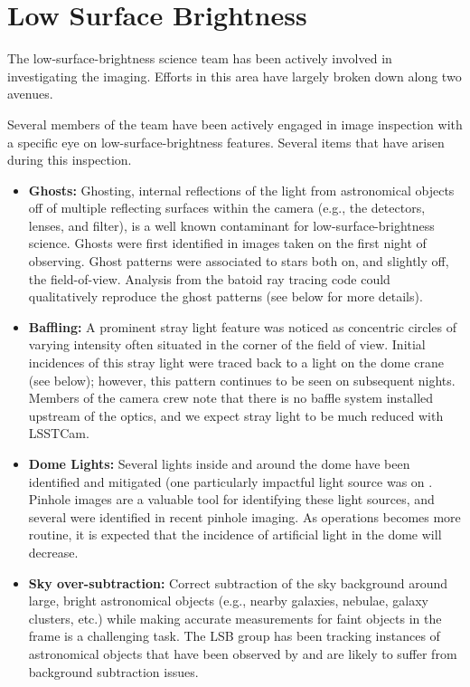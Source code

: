 \section{Low Surface Brightness}
\label{sec:low_surface_brightness}

The low-surface-brightness science team has been actively involved in investigating the \ComCam imaging. Efforts in this area have largely broken down along two avenues.

 Several members of the team have been actively engaged in image inspection with a specific eye on low-surface-brightness features. Several items that have arisen during this inspection. 

\begin{itemize}
\item {\bf Ghosts:} Ghosting, internal reflections of the light from astronomical objects off of multiple reflecting surfaces within the camera (e.g., the detectors, lenses, and filter), is a well known contaminant for low-surface-brightness science. Ghosts were first identified in images taken on the first night of \ComCam observing. Ghost patterns were associated to stars both on, and slightly off, the \ComCam field-of-view. Analysis from the batoid ray tracing code could qualitatively reproduce the ghost patterns (see below for more details).

\item {\bf Baffling:} A prominent stray light feature was noticed as concentric circles of varying intensity often situated in the corner of the \ComCam field of view. Initial incidences of this stray light were traced back to a light on the dome crane (see below); however, this pattern continues to be seen on subsequent nights.   Members of the camera crew note that there is no baffle system installed upstream of the \ComCam optics, and we expect stray light to be much reduced with LSSTCam.

\item {\bf Dome Lights:} Several lights inside and around the dome have been identified and mitigated (one particularly impactful light source was on . Pinhole images are a valuable tool for identifying these light sources, and several were identified in recent pinhole imaging. As operations becomes more routine, it is expected that the incidence of artificial light in the dome will decrease.

\item {\bf Sky over-subtraction:} Correct subtraction of the sky background around large, bright astronomical
  objects (e.g., nearby galaxies, nebulae, galaxy clusters, etc.) while making accurate measurements for faint
  objects in the frame is a challenging task. The LSB group has been tracking instances of astronomical objects that have been observed by \ComCam and are likely to suffer from background subtraction issues.


\end{itemize}
